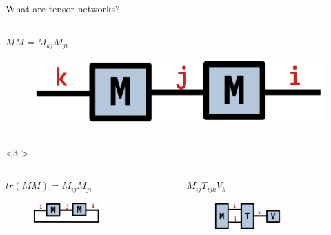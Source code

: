 \begin{frame}[fragile]{What are tensor networks?}
\begin{onlyenv}
\begin{columns}
  \begin{column}[T]{0.33\textwidth}
    \centering
    $MM = M_{kj} M_{ji}$
    \begin{figure}[T]
      \includegraphics[width=1.0\textwidth]{
        slides/assets/MM.png
      }
    \end{figure}
  \end{column}

\end{columns}

\end{onlyenv}

\vspace*{0.4cm}

\begin{onlyenv}<3->

\centering

\begin{columns}

  \begin{column}[T]{0.5\textwidth}
    \centering
    $tr(MM) = M_{ij} M_{ji}$
    \begin{figure}[T]
      \includegraphics[width=0.6\textwidth]{
        slides/assets/trMM.png
      }
    \end{figure}
  \end{column}

  \begin{column}[T]{0.5\textwidth}
    \centering
    $M_{ij} T_{ijk} V_{k}$
    \begin{figure}[T]
      \includegraphics[width=0.6\textwidth]{
        slides/assets/MTV.png
      }
    \end{figure}
  \end{column}

\end{columns}

\end{onlyenv}

\end{frame}
